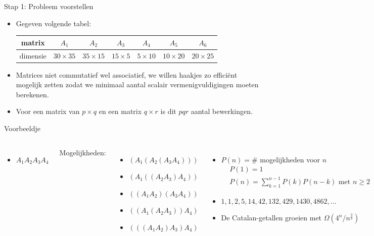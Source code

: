 \documentclass
   [kulak] %
   {kulakbeamer}
\begin{document}
\begin{frame}{Stap 1: Probleem voorstellen}
    \begin{itemize}
        \item<1-> Gegeven volgende tabel:
        \begin{table}[]
            \centering
            \begin{tabular}{c|cccccc}
                matrix & $A_1$ & $A_2$ & $A_3$ & $A_4$ & $A_5$ & $A_6$ \\
                \hline
                dimensie & $30 \times 35$ & $35 \times 15$ & $15 \times 5$ & $5 \times 10$ & $10 \times 20$ & $20 \times 25$
            \end{tabular}
        \end{table}
        \item<2-> Matrices niet commutatief wel associatief, we willen haakjes zo efficiënt mogelijk zetten zodat we minimaal aantal scalair vermenigvuldigingen moeten berekenen.
        \item<3-> Voor een matrix van $p \times q$ en een matrix $q \times r$ is dit $pqr$ aantal bewerkingen.
        \end{itemize}
\end{frame}

\begin{frame}{Voorbeeldje}
    \begin{columns}
        \begin{itemize}
            \item<1-> \begin{center} $A_1  A_2  A_3  A_4$ \end{center}
        \end{itemize}
        Mogelijkheden:
        \begin{itemize}
            \item<2-> $(A_1(A_2(A_3A_4)))$
            \item<2-> $(A_1((A_2A_3)A_4))$
            \item<2-> $((A_1A_2)(A_3A_4))$
            \item<2-> $((A_1(A_2A_3))A_4)$
            \item<2-> $(((A_1A_2)A_3)A_4)$
        \end{itemize}
        \begin{itemize}
            \item<3-> $P(n) = \#$ mogelijkheden voor $n$
            \begin{align*}
                & P(1) = 1  \\
                & P(n) = \sum_{k=1}^{n-1} P(k)P(n-k) \text{ met } n \geq 2
            \end{align*}
            \item<4-> $1, 1, 2, 5, 14, 42, 132, 429, 1430, 4862, ...$ \\
            \item<5-> De Catalan-getallen groeien met $\Omega(4^n/n^\frac{3}{2})$
        \end{itemize}
    \end{columns}
\end{frame}
\end{document}
